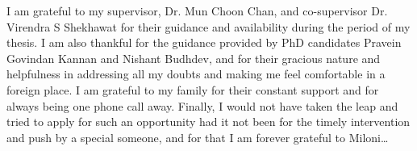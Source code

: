 \documentclass[11pt, a4paper, oneside]{Thesis} %
\title{\ttitle} %
\begin{document}
\frontmatter %


\fancyhead{} %
\rhead{\thepage} %
\lhead{} %

\pagestyle{fancy} %


\maketitle


\begin{acknowledgements}
I am grateful to my supervisor, Dr. Mun Choon Chan, and co-supervisor Dr. Virendra S Shekhawat
for their guidance and availability during the period of my thesis. I am also thankful for the
guidance provided by PhD candidates Pravein Govindan Kannan and Nishant Budhdev, and for their gracious nature 
and helpfulness in addressing all my doubts and making me feel comfortable in a foreign place. I am grateful to my family 
for their constant support and for always being one phone call away. Finally, I would not have taken the leap and tried to 
apply for such an opportunity had it not been for the timely intervention and push by a special someone, and for that I am forever grateful to Miloni\ldots
\end{acknowledgements}

\end{document}

